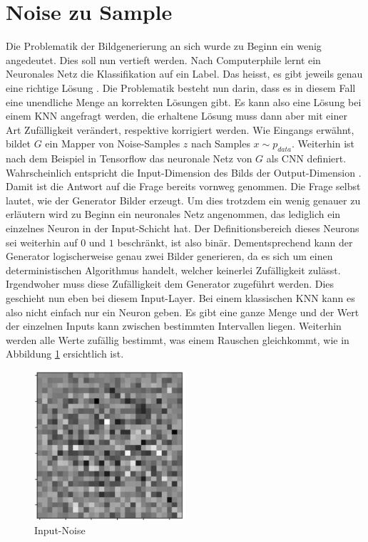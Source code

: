 \section{Noise zu Sample}
Die Problematik der Bildgenerierung an sich wurde zu Beginn ein wenig angedeutet. Dies soll nun vertieft
werden. Nach \glqq Computerphile \grqq{} lernt ein Neuronales Netz die Klassifikation auf ein Label. Das heisst, es gibt
jeweils genau eine richtige Lösung \cite[~t 4:00]{youtube:gan}. Die Problematik besteht nun darin, dass es in diesem Fall eine
unendliche Menge an korrekten Lösungen gibt. Es kann also eine Lösung bei einem \Gls{KNN} angefragt werden, die erhaltene
Lösung muss dann aber mit einer Art \glqq Zufälligkeit\grqq{} verändert, respektive korrigiert werden.
\para
Wie Eingangs erwähnt, bildet $G$ ein Mapper von Noise-Samples $z$ nach Samples $x \sim p_{data}$. Weiterhin ist nach
dem Beispiel in Tensorflow das neuronale Netz von $G$ als \Gls{CNN} definiert. Wahrscheinlich entspricht die Input-Dimension des
Bilds der Output-Dimension \cite{tensorflow:1:gan}. Damit ist die Antwort auf die Frage bereits vornweg genommen.
Die Frage selbst lautet, wie der Generator Bilder erzeugt. Um dies trotzdem ein wenig genauer zu erläutern wird zu Beginn
ein neuronales Netz angenommen, das lediglich ein einzelnes Neuron in der Input-Schicht hat. Der Definitionsbereich dieses Neurons sei
weiterhin auf $0$ und $1$ beschränkt, ist also binär. Dementsprechend kann der Generator logischerweise genau zwei Bilder
generieren, da es sich um einen deterministischen Algorithmus handelt, welcher keinerlei Zufälligkeit zulässt.
\para
Irgendwoher muss diese Zufälligkeit dem Generator zugeführt werden. Dies geschieht nun eben bei diesem Input-Layer.
Bei einem klassischen \Gls{KNN} kann es also nicht einfach nur ein Neuron geben. Es gibt eine ganze Menge und der Wert
der einzelnen Inputs kann zwischen bestimmten Intervallen liegen. Weiterhin werden alle Werte zufällig bestimmt,
was einem Rauschen gleichkommt, wie in Abbildung \ref{fig:Input-Noise} ersichtlich ist.
\begin{figure}[h!]
    \begin{center}
        \includegraphics[width=0.5\textwidth]{../common/02_main/resources/05_noise.png}
    \end{center}
    \caption{Input-Noise \cite{tensorflow:1:gan}}
    \label{fig:Input-Noise}
\end{figure}
